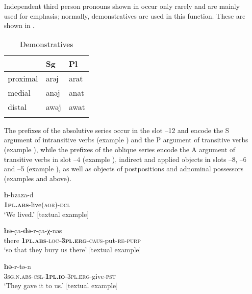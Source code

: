 \documentclass[output=paper]{langscibook}
\begin{document}
Independent third person pronouns shown in  occur only rarely and are mainly used for emphasis; normally, demonstratives are used in this function. These are shown in .



\begin{table}
\begin{tabularx}{0.5\textwidth}{XXX} 
\lsptoprule
& Sg & Pl\\
\hline
proximal & {ar{ə}j} & {arat}\\
medial & {an{ə}j} & {anat}\\
distal & {aw{ə}j} & {awat}\\
\lspbottomrule
\end{tabularx}
\caption{Demonstratives}
\label{tab:Arkadiev:3}
\end{table}

The prefixes of the absolutive series occur in the slot –12 and encode the S argument of intransitive verbs (example ) and the P argument of transitive verbs (example ), while the prefixes of the oblique series encode the A argument of transitive verbs in slot –4 (example ), indirect and applied objects in slots –8, –6 and –5 (example ), as well as objects of postpositions and adnominal possessors (examples  and  above).



\ea 
\label{ex:Arkadiev:7}
    \ea 
    \label{ex:Arkadiev:7a}
    \gll \textbf{{h}}{{}-bzaza-d}\\
     \textbf{\textsc{1pl.abs}}\textsc{{}-}live(\textsc{aor)-dcl}\\
    \glt ‘We lived.’ [textual example]
    
    \ex 
    \label{ex:Arkadiev:7b}
     \textbf{{h{ə}}}{{}-c{̣}a-}\textbf{{d{ə}}}{{}-r-c{̣}a-χ-n{ə}s}\\
    there  \textbf{\textsc{1pl.abs}}\textsc{{}-loc-}\textbf{\textsc{3pl.erg}}\textsc{{}-caus}{}-put-\textsc{re-purp}\\
    \glt ‘so that they bury us there’ [textual example]
    
    \ex 
    \label{ex:Arkadiev:7c}
    \textbf{{h{ə}}}{{}-r-t{ə}-n}\\
   \textsc{3sg.n.abs-csl-}\textbf{\textsc{1pl.io}}\textsc{{}-3pl.erg}{}-give-\textsc{pst}\\
    \glt ‘They gave it to us.’ [textual example]
    \z
\z
 
\end{document}
